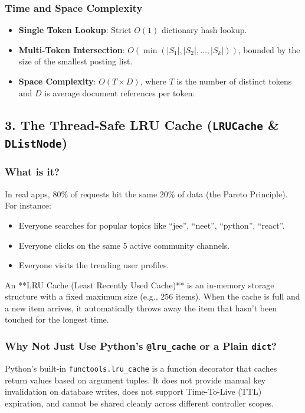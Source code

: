\documentclass[11pt,a4paper]{article}
\begin{document}
\subsubsection{Time and Space Complexity}
\begin{itemize}
    \item \textbf{Single Token Lookup}: Strict $O(1)$ dictionary hash lookup.
    \item \textbf{Multi-Token Intersection}: $O(\min(|S_1|, |S_2|, \dots, |S_k|))$, bounded by the size of the smallest posting list.
    \item \textbf{Space Complexity}: $O(T \times D)$, where $T$ is the number of distinct tokens and $D$ is average document references per token.
\end{itemize}

\subsection{3. The Thread-Safe LRU Cache (\texttt{LRUCache} \& \texttt{DListNode})}

\subsubsection{What is it?}
In real apps, 80\% of requests hit the same 20\% of data (the Pareto Principle). For instance:
\begin{itemize}
    \item Everyone searches for popular topics like ``jee'', ``neet'', ``python'', ``react''.
    \item Everyone clicks on the same 5 active community channels.
    \item Everyone visits the trending user profiles.
\end{itemize}

An **LRU Cache (Least Recently Used Cache)** is an in-memory storage structure with a fixed maximum size (e.g., 256 items). When the cache is full and a new item arrives, it automatically throws away the item that hasn't been touched for the longest time.

\subsubsection{Why Not Just Use Python's \texttt{@lru\_cache} or a Plain \texttt{dict}?}
Python's built-in \texttt{functools.lru\_cache} is a function decorator that caches return values based on argument tuples. It does not provide manual key invalidation on database writes, does not support Time-To-Live (TTL) expiration, and cannot be shared cleanly across different controller scopes.
\end{document}
